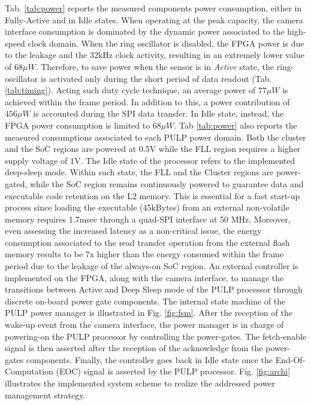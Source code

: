 \documentclass[journal]{IEEEtran}
\begin{document}
Tab. \ref{tab:power} reports the measured components power consumption, either in Fully-Active and in Idle states. When operating at the peak capacity, the camera interface consumption is dominated by the dynamic power associated to the high-speed clock domain. When the ring oscillator is disabled, the FPGA power is due to the leakage and the 32kHz clock activity, resulting in an extremely lower value of $68\mu W$. Therefore, to save power when the sensor is in \textit{Active} state, the ring-oscillator is activated only during the short period of data readout (Tab. \ref{tab:timing}). Acting such duty cycle technique, an average power of $77\mu W$ is achieved within the frame period. In addition to this, a power contribution of $456\mu W$ is accounted during the SPI data transfer. In Idle state, instead, the FPGA power consumption is limited to $68\mu W$.
Tab \ref{tab:power} also reports the measured consumptions associated to each PULP power domain. Both the cluster and the SoC regions are powered at 0.5V while the FLL region requires a higher supply voltage of 1V. The Idle state of the processor refers to the implemented deep-sleep mode. Within such state, the FLL and the Cluster regions are power-gated, while the SoC region remains continuously powered to guarantee data and executable code retention on the L2 memory.  This is essential for a fast start-up process since loading the executable (45kBytes) from an external non-volatile memory requires 1.7msec through a quad-SPI interface at 50 MHz\cite{FLASH}. Moreover, even assessing the increased latency as a non-critical issue, the energy consumption associated to the read transfer operation from the external flash memory results to be 7x higher than the energy consumed within the frame period due to the leakage of the always-on SoC region.
An external controller is implemented on the FPGA, along with the camera interface, to manage the transitions between Active and Deep Sleep mode of the PULP processor through discrete on-board power gate components. The internal state machine of the PULP power manager is illustrated in Fig. \ref{fig:fsm}. After the reception of the wake-up event from the camera interface, the power manager is in charge of powering-on the PULP processor by controlling the power-gates. The fetch-enable signal is then asserted after the reception of the acknowledge from the power-gates components. Finally, the controller goes back in Idle state once the End-Of-Computation (EOC) signal is asserted by the PULP processor.
Fig. \ref{fig:archi} illustrates the implemented system scheme to realize the addressed power management strategy.
\end{document}
